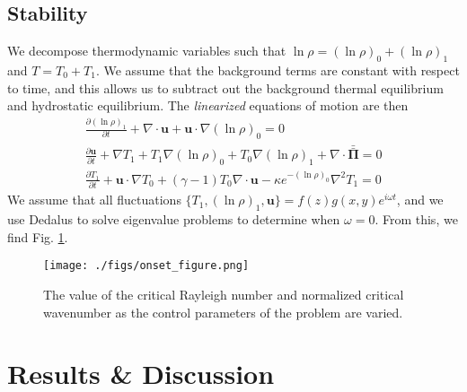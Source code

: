 \documentclass[aps, pre, onecolumn, nofootinbib, notitlepage, groupedaddress, amsfonts, amssymb, amsmath, longbibliography]{revtex4-1}
\newcommand{\grad}{\ensuremath{\nabla}}
\newcommand{\stressT}{\ensuremath{\bm{\bar{\bar{\Pi}}}}}
\begin{document}
\subsection{Stability}
We decompose thermodynamic variables such that $\ln\rho = (\ln\rho)_0 + (\ln\rho)_1$
and $T = T_0 + T_1$.  We assume that the background terms are constant with respect to
time, and this allows us to subtract out the background thermal equilibrium and
hydrostatic equilibrium.  The \emph{linearized} equations of motion are then
\begin{equation}
\begin{split}
\frac{\partial (\ln\rho)_1}{\partial t} + \grad\cdot\bm{u} + \bm{u}\cdot\grad(\ln\rho)_0 = 0 \\
\frac{\partial \bm{u}}{\partial t} + \grad T_1 + T_1 \grad(\ln\rho)_0 + T_0 \grad(\ln\rho)_1
+ \grad \cdot\stressT = 0 \\
\frac{\partial T_1}{\partial t} + \bm{u}\cdot\grad T_0 + (\gamma-1)T_0\grad\cdot\bm{u} - \kappa e^{-(\ln\rho)_0}
\grad^2 T_1 = 0
\end{split}
\end{equation}
We assume that all fluctuations $\{ T_1, (\ln\rho)_1, \bm{u} \} = f(z) g(x, y) e^{i\omega t}$, and we
use Dedalus to solve eigenvalue problems to determine when $\omega = 0$.  From this, we find
Fig. \ref{fig:onset_curves}.

\begin{figure}
\centering
\texttt{[image: ./figs/onset\_figure.png]}
\caption{The value of the critical Rayleigh number and normalized critical wavenumber
as the control parameters of the problem are varied. \label{fig:onset_curves}}
\end{figure}


\section{Results \& Discussion}
\label{sec:results}


\end{document}
